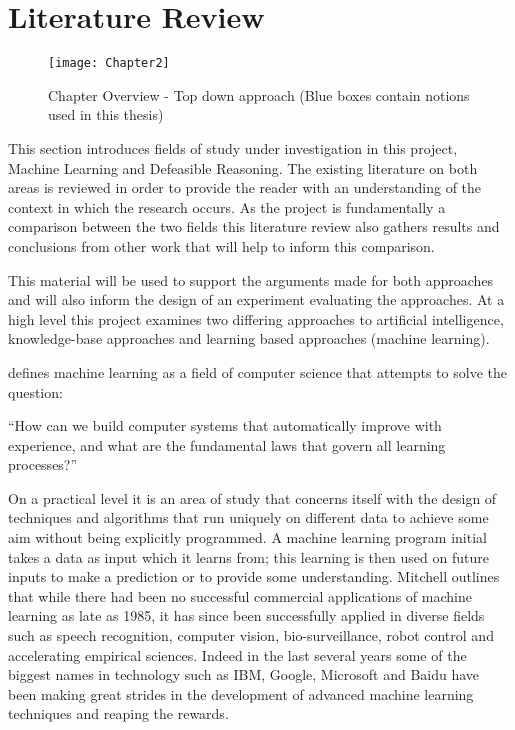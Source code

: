 \chapter{Literature Review} 

\label{Chapter2} 


\begin{figure}[!h]
\centering
\texttt{[image: Chapter2]}
\caption{Chapter Overview - Top down approach (Blue boxes contain notions used in this thesis)}
\label{fig:chapter_overview}
\end{figure}

This section introduces fields of study under investigation in this project, Machine Learning and Defeasible Reasoning. The existing literature on both areas is reviewed in order to provide the reader with an understanding of the context in which the research occurs. As the project is fundamentally a comparison between the two fields this literature review also gathers results and conclusions from other work that will help to inform this comparison. 

This material will be used to support the arguments made for both approaches and will also inform the design of an experiment evaluating the approaches. At a high level this project examines two differing approaches to artificial intelligence, knowledge-base approaches and learning based approaches (machine learning).

\cite{mitchell2006discipline} defines machine learning as a field of computer science that attempts to solve the question:

``How can we build computer systems that automatically improve with experience, and what are the fundamental laws that govern all learning processes?''

On a practical level it is an area of study that concerns itself with the design of techniques and algorithms that run uniquely on different data to achieve some aim without being explicitly programmed. A machine learning program initial takes a data as input which it learns from; this learning is then used on future inputs to make a prediction or to provide some understanding. Mitchell outlines that while there had been no successful commercial applications of machine learning as late as 1985, it has since been successfully applied in diverse fields such as speech recognition, computer vision, bio-surveillance, robot control and accelerating empirical sciences. Indeed in the last several years some of the biggest names in technology such as IBM, Google, Microsoft and Baidu have been making great strides in the development of advanced machine learning techniques and reaping the rewards.

